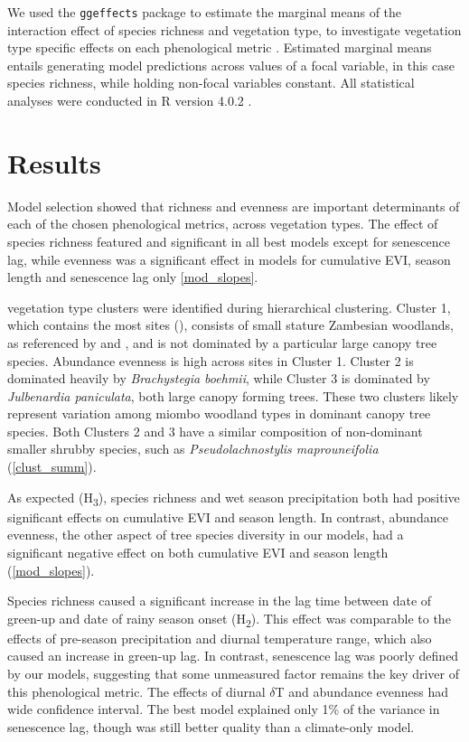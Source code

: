 \documentclass[11pt,a4paper]{article}
\begin{document}
We used the \texttt{ggeffects} package to estimate the marginal means of the interaction effect of species richness and vegetation type, to investigate vegetation type specific effects on each phenological metric \citep{ggeffects}. Estimated marginal means entails generating model predictions across values of a focal variable, in this case species richness, while holding non-focal variables constant. All statistical analyses were conducted in R version 4.0.2 \citep{R2020}.

\section{Results}

Model selection showed that richness and evenness are important determinants of each of the chosen phenological metrics, across vegetation types. The effect of species richness featured and significant in all best models except for senescence lag, while evenness was a significant effect in models for cumulative EVI, season length and senescence lag only \autoref{mod_slopes}. 

\nCluster{} vegetation type clusters were identified during hierarchical clustering. Cluster 1, which contains the most sites (\nClusterA{}), consists of small stature Zambesian woodlands, as referenced by \citet{Dinerstein2017} and \citet{Chidumayo2001}, and is not dominated by a particular large canopy tree species. Abundance evenness is high across sites in Cluster 1. Cluster 2 is dominated heavily by \textit{Brachystegia boehmii}, while Cluster 3 is dominated by \textit{Julbenardia paniculata}, both large canopy forming trees. These two clusters likely represent variation among miombo woodland types in dominant canopy tree species. Both Clusters 2 and 3 have a similar composition of non-dominant smaller shrubby species, such as \textit{Pseudolachnostylis maprouneifolia} (\autoref{clust_summ}).

As expected (H\textsubscript{3}), species richness and wet season precipitation both had positive significant effects on cumulative EVI and season length. In contrast, abundance evenness, the other aspect of tree species diversity in our models, had a significant negative effect on both cumulative EVI and season length (\autoref{mod_slopes}).

Species richness caused a significant increase in the lag time between date of green-up and date of rainy season onset (H\textsubscript{2}). This effect was comparable to the effects of pre-season precipitation and diurnal temperature range, which also caused an increase in green-up lag. In contrast, senescence lag was poorly defined by our models, suggesting that some unmeasured factor remains the key driver of this phenological metric. The effects of diurnal $\delta$T and abundance evenness had wide confidence interval. The best model explained only 1\% of the variance in senescence lag, though was still better quality than a climate-only model.
\end{document}
